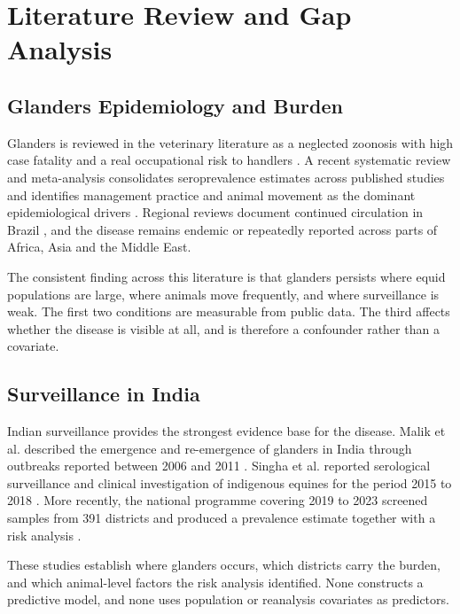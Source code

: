 \documentclass[10pt,openany]{report}
\begin{document}
\chapter{Literature Review and Gap Analysis}
\label{ch:lit}

\section{Glanders Epidemiology and Burden}

Glanders is reviewed in the veterinary literature as a neglected zoonosis with high case
fatality and a real occupational risk to handlers \cite{khan2013,kanani2026}. A recent
systematic review and meta-analysis consolidates seroprevalence estimates across published
studies and identifies management practice and animal movement as the dominant epidemiological
drivers \cite{purnama2026}. Regional reviews document continued circulation in Brazil
\cite{mota2022}, and the disease remains endemic or repeatedly reported across parts of Africa,
Asia and the Middle East.

The consistent finding across this literature is that glanders persists where equid populations
are large, where animals move frequently, and where surveillance is weak. The first two
conditions are measurable from public data. The third affects whether the disease is visible at
all, and is therefore a confounder rather than a covariate.

\section{Surveillance in India}

Indian surveillance provides the strongest evidence base for the disease. Malik et al. described
the emergence and re-emergence of glanders in India through outbreaks reported between 2006 and
2011 \cite{malik2012}. Singha et al. reported serological surveillance and clinical investigation
of indigenous equines for the period 2015 to 2018 \cite{singha2020}. More recently, the national
programme covering 2019 to 2023 screened samples from 391 districts and produced a prevalence
estimate together with a risk analysis \cite{singha2026}.

These studies establish where glanders occurs, which districts carry the burden, and which
animal-level factors the risk analysis identified. None constructs a predictive model, and none
uses population or reanalysis covariates as predictors.
\end{document}
